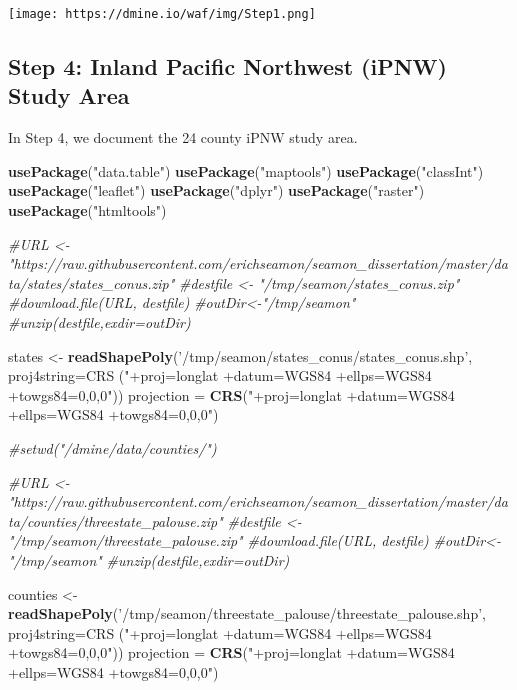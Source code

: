 \documentclass[]{article}
\newenvironment{Shaded}{\begin{snugshade}}{\end{snugshade}}
\newcommand{\CommentTok}[1]{\textcolor[rgb]{0.56,0.35,0.01}{\textit{#1}}}
\newcommand{\DataTypeTok}[1]{\textcolor[rgb]{0.13,0.29,0.53}{#1}}
\newcommand{\KeywordTok}[1]{\textcolor[rgb]{0.13,0.29,0.53}{\textbf{#1}}}
\newcommand{\NormalTok}[1]{#1}
\newcommand{\StringTok}[1]{\textcolor[rgb]{0.31,0.60,0.02}{#1}}
\begin{document}
\texttt{[image: https://dmine.io/waf/img/Step1.png]}

\hypertarget{step-4-inland-pacific-northwest-ipnw-study-area}{%
\subsection{Step 4: Inland Pacific Northwest (iPNW) Study
Area}\label{step-4-inland-pacific-northwest-ipnw-study-area}}

In Step 4, we document the 24 county iPNW study area.

\begin{Shaded}
\begin{Highlighting}[]
\KeywordTok{usePackage}\NormalTok{(}\StringTok{"data.table"}\NormalTok{)}
\KeywordTok{usePackage}\NormalTok{(}\StringTok{"maptools"}\NormalTok{)}
\KeywordTok{usePackage}\NormalTok{(}\StringTok{"classInt"}\NormalTok{)}
\KeywordTok{usePackage}\NormalTok{(}\StringTok{"leaflet"}\NormalTok{)}
\KeywordTok{usePackage}\NormalTok{(}\StringTok{"dplyr"}\NormalTok{)}
\KeywordTok{usePackage}\NormalTok{(}\StringTok{"raster"}\NormalTok{)}
\KeywordTok{usePackage}\NormalTok{(}\StringTok{"htmltools"}\NormalTok{)}

\CommentTok{#URL <- "https://raw.githubusercontent.com/erichseamon/seamon_dissertation/master/data/states/states_conus.zip"}
\CommentTok{#destfile <- "/tmp/seamon/states_conus.zip"}
\CommentTok{#download.file(URL, destfile)}
\CommentTok{#outDir<-"/tmp/seamon"}
\CommentTok{#unzip(destfile,exdir=outDir)}

\NormalTok{states <-}\StringTok{ }\KeywordTok{readShapePoly}\NormalTok{(}\StringTok{'/tmp/seamon/states_conus/states_conus.shp'}\NormalTok{,}
                        \DataTypeTok{proj4string=}\NormalTok{CRS}
\NormalTok{                        (}\StringTok{"+proj=longlat +datum=WGS84 +ellps=WGS84 +towgs84=0,0,0"}\NormalTok{))}
\NormalTok{projection =}\StringTok{ }\KeywordTok{CRS}\NormalTok{(}\StringTok{"+proj=longlat +datum=WGS84 +ellps=WGS84 +towgs84=0,0,0"}\NormalTok{)}



\CommentTok{#setwd("/dmine/data/counties/")}


\CommentTok{#URL <- "https://raw.githubusercontent.com/erichseamon/seamon_dissertation/master/data/counties/threestate_palouse.zip"}
\CommentTok{#destfile <- "/tmp/seamon/threestate_palouse.zip"}
\CommentTok{#download.file(URL, destfile)}
\CommentTok{#outDir<-"/tmp/seamon"}
\CommentTok{#unzip(destfile,exdir=outDir)}

\NormalTok{counties <-}\StringTok{ }\KeywordTok{readShapePoly}\NormalTok{(}\StringTok{'/tmp/seamon/threestate_palouse/threestate_palouse.shp'}\NormalTok{,}
                     \DataTypeTok{proj4string=}\NormalTok{CRS}
\NormalTok{                     (}\StringTok{"+proj=longlat +datum=WGS84 +ellps=WGS84 +towgs84=0,0,0"}\NormalTok{))}
\NormalTok{projection =}\StringTok{ }\KeywordTok{CRS}\NormalTok{(}\StringTok{"+proj=longlat +datum=WGS84 +ellps=WGS84 +towgs84=0,0,0"}\NormalTok{)}



\end{Highlighting}
\end{Shaded}
\end{document}
